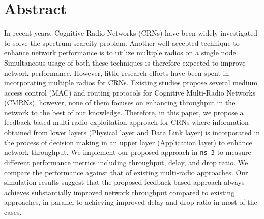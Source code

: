 \chapter*{Abstract}
 In recent years, Cognitive Radio Networks (CRNs) have been widely investigated to solve the spectrum scarcity problem. Another well-accepted technique to enhance network performance is to utilize multiple radios on a single node. Simultaneous usage of both these techniques is therefore expected to improve network performance. However, little research efforts have been spent in incorporating multiple radios for CRNs. Existing studies propose several medium access control (MAC) and routing protocols for Cognitive Multi-Radio Networks (CMRNs), however, none of them focuses on enhancing throughput in the network to the best of our knowledge. Therefore, in this paper, we propose a feedback-based multi-radio exploitation approach for CRNs where information obtained from lower layers (Physical layer and Data Link layer) is incorporated in the process of decision making in an upper layer (Application layer) to enhance network throughput. We implement our proposed approach in \texttt{ns-3} to measure different performance metrics including throughput, delay, and drop ratio. We compare the performance against that of existing multi-radio approaches. Our simulation results suggest that the proposed feedback-based approach always achieves substantially improved network throughput compared to existing approaches, in parallel to achieving improved delay and drop-ratio in most of the cases.
